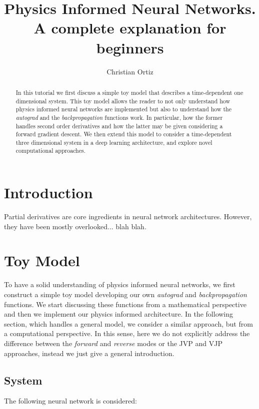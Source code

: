 \documentclass{article}
\title{Physics Informed Neural Networks. \\A complete explanation for beginners}
\author{Christian Ortiz}
\begin{document}
\maketitle

\begin{abstract}
In this tutorial we first discuss a simple toy model that describes a time-dependent one dimensional system. This toy model allows the reader to not only understand how physics informed neural networks are implemented but also to understand how the \textit{autograd} and the \textit{backpropagation} functions work. In particular, how the former handles second order derivatives and how the latter may be given considering a forward gradient descent. We then extend this model to consider a time-dependent three dimensional system in a deep learning architecture, and explore novel computational approaches.
\end{abstract}

\section{Introduction}
Partial derivatives are core ingredients in neural network architectures. However, they have been mostly overlooked... blah blah.



\section{Toy Model}
To have a solid understanding of physics informed neural networks, we first construct a simple toy model developing our own \textit{autograd} and \textit{backpropagation} functions. We start discussing these functions from a mathematical perspective and then we implement our physics informed architecture. In the following section, which handles a general model, we consider a similar approach, but from a computational perspective. In this sense, here we do not explicitly address the difference between the \textit{forward} and \textit{reverse} modes or the JVP and VJP approaches, instead we just give a general introduction. 

\newpage
\subsection{System} 

The following neural network is considered: 
\end{document}
